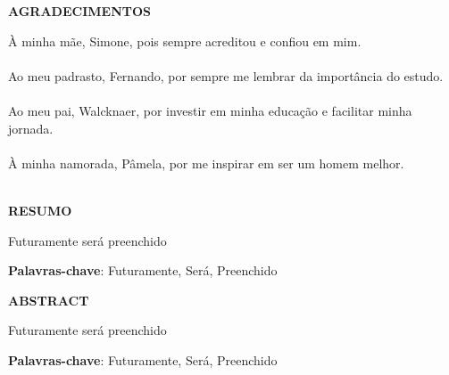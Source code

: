\vspace{-60mm}

\begin{center}
   {\Large\bf AGRADECIMENTOS}\\
   \vspace{1mm}
\end{center}\hspace{5mm}
\begin{flushright}
  \begin{minipage}[t]{8cm}
    
    \`A minha m\~ae, Simone, pois sempre acreditou e confiou em mim. \\\\
    Ao meu padrasto, Fernando, por sempre me lembrar da import\^ancia do estudo. \\\\
    Ao meu pai, Walcknaer, por investir em minha educa\c{c}\~ao e facilitar minha jornada. \\\\
    \`A minha namorada, P\^amela, por me inspirar em ser um homem melhor.\\\\
  \end{minipage}
\end{flushright}
\cleardoublepage
\thispagestyle{empty}

\vspace{-60mm}

\begin{center}
   {\Large\bf RESUMO}\\
   \vspace{1mm}
\end{center}\hspace{5mm}

Futuramente ser\'a preenchido

{\hspace{-8mm} \bf{Palavras-chave}}: Futuramente, Ser\'a, Preenchido
\cleardoublepage
\thispagestyle{empty}

\vspace{-60mm}

\begin{center}
   {\Large\bf ABSTRACT}\\
   \vspace{1mm}
\end{center}\hspace{5mm}

Futuramente ser\'a preenchido

{\hspace{-8mm} \bf{Palavras-chave}}: Futuramente, Ser\'a, Preenchido
